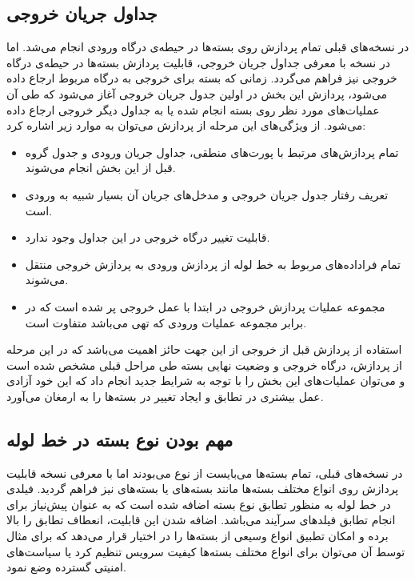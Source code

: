 \subsection{جداول جریان خروجی}
در نسخه‌های قبلی تمام پردازش روی بسته‌ها در حیطه‌ی درگاه ورودی انجام می‌شد. اما در نسخه  با معرفی جداول جریان خروجی، قابلیت پردازش بسته‌ها در حیطه‌ی درگاه خروجی نیز فراهم می‌گردد. زمانی که بسته برای خروجی به درگاه مربوط ارجاع داده می‌شود، پردازش این بخش در اولین جدول جریان خروجی آغاز می‌شود که طی آن عملیات‌های مورد نظر روی بسته انجام شده یا به جداول دیگر خروجی ارجاع داده می‌شود. از ویژگی‌های این مرحله از پردازش می‌توان به موارد زیر اشاره کرد:
\begin{itemize}
	\item
تمام پردازش‌های مرتبط با پورت‌های منطقی، جداول جریان ورودی و جدول گروه قبل از این بخش انجام می‌شوند.
	\item
تعریف رفتار جدول جریان خروجی و مدخل‌های جریان آن بسیار شبیه به ورودی است.
	\item
قابلیت تغییر درگاه خروجی در این جداول وجود ندارد.
	\item
تمام فراداده‌های مربوط به خط لوله از پردازش  ورودی به پردازش خروجی منتقل می‌شوند.
	\item
مجموعه عملیات پردازش خروجی در ابتدا با عمل خروجی پر شده است که در برابر مجموعه عملیات ورودی که تهی می‌باشد متفاوت است.
\end{itemize}
استفاده از پردازش قبل از خروجی از این جهت حائز اهمیت می‌باشد که در این مرحله از پردازش، درگاه خروجی و وضعیت نهایی بسته طی مراحل قبلی مشخص شده است و می‌توان عملیات‌های این بخش را با توجه به شرایط جدید انجام داد که این خود آزادی عمل بیشتری در تطابق و ایجاد تغییر در بسته‌ها را به ارمغان می‌آورد.

\subsection{مهم بودن نوع بسته در خط لوله}
در نسخه‌های قبلی، تمام بسته‌ها می‌بایست از نوع  می‌بودند اما با معرفی نسخه  قابلیت پردازش روی انواع مختلف بسته‌ها مانند بسته‌های  یا بسته‌های  نیز فراهم گردید. فیلدی در خط لوله به منظور تطابق نوع بسته اضافه شده است که به عنوان پیش‌نیاز برای انجام تطابق فیلد‌های سرآیند می‌باشد. اضافه شدن این قابلیت، انعطاف تطابق را بالا برده و امکان تطبیق انواع وسیعی از بسته‌ها را در اختیار قرار می‌دهد که برای مثال توسط آن می‌توان برای انواع مختلف بسته‌ها کیفیت سرویس تنظیم کرد یا سیاست‌های امنیتی گسترده وضع نمود.

\pagebreak

